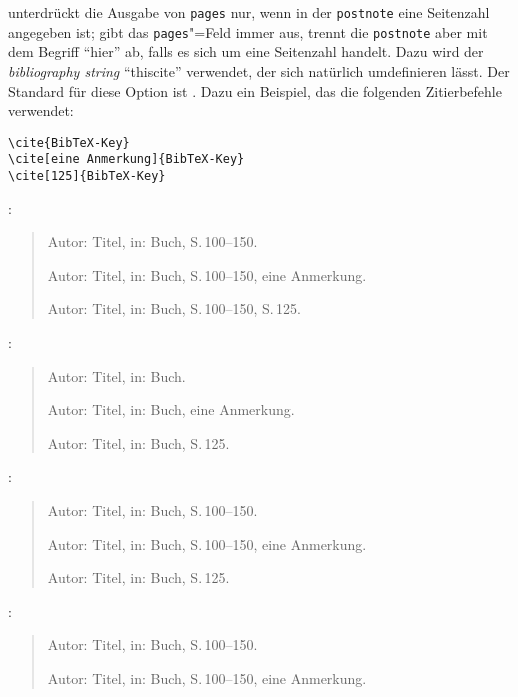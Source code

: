 \documentclass[ngerman]{scrartcl}
\begin{document}
\begin{itemize}
				 unterdrückt die Ausgabe von \texttt{pages} nur, wenn
				in der \texttt{postnote} eine Seitenzahl angegeben ist;
				 gibt das \texttt{pages}"=Feld immer aus, trennt
				die \texttt{postnote} aber mit dem Begriff \enquote{hier} ab, falls es sich 
				um eine Seitenzahl handelt. Dazu wird der \emph{bibliography string} \enquote{thiscite}
				verwendet, der sich natürlich umdefinieren lässt. 		
				Der Standard für diese Option ist .
				Dazu ein Beispiel, das die folgenden Zitierbefehle verwendet:
				\begin{lstlisting}
\cite{BibTeX-Key}
\cite[eine Anmerkung]{BibTeX-Key}
\cite[125]{BibTeX-Key}
				\end{lstlisting}
				:
				\begin{quote}
				Autor: Titel, in: Buch, S.\,100--150.

				Autor: Titel, in: Buch, S.\,100--150, eine Anmerkung.

				Autor: Titel, in: Buch, S.\,100--150, S.\,125.
				\end{quote}
				:
				\begin{quote}
				Autor: Titel, in: Buch.

				Autor: Titel, in: Buch, eine Anmerkung.

				Autor: Titel, in: Buch, S.\,125.
				\end{quote}
				:
				\begin{quote}
				Autor: Titel, in: Buch, S.\,100--150.

				Autor: Titel, in: Buch, S.\,100--150, eine Anmerkung.

				Autor: Titel, in: Buch, S.\,125.
				\end{quote}
				:
				\begin{quote}
				Autor: Titel, in: Buch, S.\,100--150.

				Autor: Titel, in: Buch, S.\,100--150, eine Anmerkung.


\end{quote}
\end{itemize}
\end{document}
